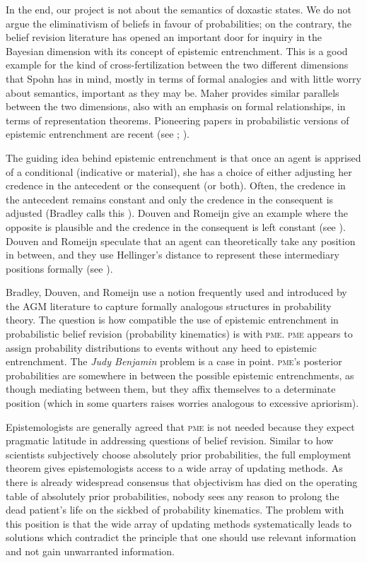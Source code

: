 \documentclass[phd,12pt,oneside]{ubcthesis}
\begin{document}
In the end, our project is not about the semantics of doxastic states.
We do not argue the eliminativism of beliefs in favour of
probabilities; on the contrary, the belief revision literature has
opened an important door for inquiry in the Bayesian dimension with
its concept of epistemic entrenchment. This is a good example for the
kind of cross-fertilization between the two different dimensions that
Spohn has in mind, mostly in terms of formal analogies and with little
worry about semantics, important as they may be. Maher provides
similar parallels between the two dimensions, also with an emphasis on
formal relationships, in terms of representation theorems. Pioneering
papers in probabilistic versions of epistemic entrenchment are recent
(see ; ).

The guiding idea behind epistemic entrenchment is that once an agent
is apprised of a conditional (indicative or material), she has a
choice of either adjusting her credence in the antecedent or the
consequent (or both). Often, the credence in the antecedent remains
constant and only the credence in the consequent is adjusted (Bradley
calls this ). Douven and Romeijn give an
example where the opposite is plausible and the credence in the
consequent is left constant (see ).
Douven and Romeijn speculate that an agent can theoretically take any
position in between, and they use Hellinger's distance to represent
these intermediary positions formally (see
).

Bradley, Douven, and Romeijn use a notion frequently used and
introduced by the AGM literature to capture formally analogous
structures in probability theory. The question is how compatible the
use of epistemic entrenchment in probabilistic belief revision
(probability kinematics) is with \textsc{pme}. \textsc{pme} appears to
assign probability distributions to events without any heed to
epistemic entrenchment. The \emph{Judy Benjamin} problem is a case in
point. \textsc{pme}'s posterior probabilities are somewhere in between
the possible epistemic entrenchments, as though mediating between
them, but they affix themselves to a determinate position (which in
some quarters raises worries analogous to excessive apriorism).

Epistemologists are generally agreed that \textsc{pme} is not needed
because they expect pragmatic latitude in addressing questions of
belief revision. Similar to how scientists subjectively choose
absolutely prior probabilities, the full employment theorem gives
epistemologists access to a wide array of updating methods. As there
is already widespread consensus that objectivism has died on the
operating table of absolutely prior probabilities, nobody sees any
reason to prolong the dead patient's life on the sickbed of
probability kinematics. The problem with this position is that the
wide array of updating methods systematically leads to solutions which
contradict the principle that one should use relevant information and
not gain unwarranted information.
\end{document}
